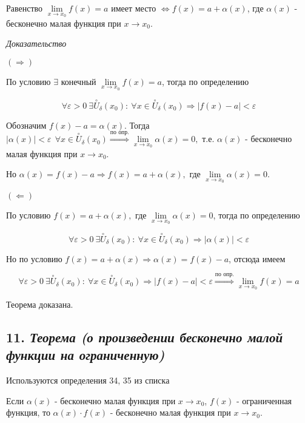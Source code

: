 Равенство $\lim\limits_{x \to x_0}f(x) = a$ имеет место $\iff f(x) = a + \alpha(x)$, где $\alpha(x)$ - бесконечно малая функция при $x \rightarrow x_0$.
\vspace*{20pt} 

\textit{Доказательство}

$(\Rightarrow)$

По условию $\exists$ конечный $\lim\limits_{x \to x_0}f(x) = a$, тогда по определению

$$
\forall{\varepsilon} > 0 \ \exists \overset{\circ}U_\delta(x_0): \ \forall x \in \overset{\circ}U_\delta(x_0) \Rightarrow |f(x) - a| <{\varepsilon}
$$

Обозначим $f(x) - a = \alpha(x)$. Тогда $\mid \alpha(x)\mid  < {\varepsilon}\ \ \forall x \in \overset{\circ}U_\delta(x_0) \overset{\text{по опр.}}\Rightarrow \lim\limits_{x \to x_0}\alpha(x) = 0,$ т.е. $\alpha(x)$ - бесконечно малая функция при $x \rightarrow x_0$.

Но $\alpha(x) = f(x) - a \Rightarrow f(x) = a + \alpha(x), \text{ где } \lim\limits_{x \to x_0}\alpha(x) = 0$.

$(\Leftarrow)$

По условию $f(x) = a + \alpha(x),\text{ где } \lim\limits_{x \to x_0}\alpha(x) = 0$, тогда по определению

$$
\forall{\varepsilon} > 0 \ \exists \overset{\circ}U_\delta(x_0): \ \forall x \in \overset{\circ}U_\delta(x_0) \Rightarrow |\alpha(x)| <{\varepsilon}
$$

Но по условию $f(x) = a + \alpha(x) \Rightarrow \alpha(x) = f(x) - a$, отсюда имеем

$$
\forall{\varepsilon} > 0 \ \exists \overset{\circ}U_\delta(x_0): \ \forall x \in \overset{\circ}U_\delta(x_0) \Rightarrow |f(x) - a| <{\varepsilon} \overset{\text{по опр.}}\Rightarrow \lim\limits_{x \to x_0}f(x) = a
$$

Теорема доказана.
\newpage 
\subsection*{11. \textit{Теорема (о произведении бесконечно малой функции на ограниченную)}}
\begin{Quote2} 
\small\centering 

Используются определения 34, 35 из списка \end{Quote2} 

Если $\alpha(x)$ - бесконечно малая функция при $x \rightarrow x_0$, $f(x)$ - ограниченная функция, то $\alpha(x)\cdot f(x)$ - бесконечно малая функция при $x \rightarrow x_0$.
\vspace*{20pt} 

